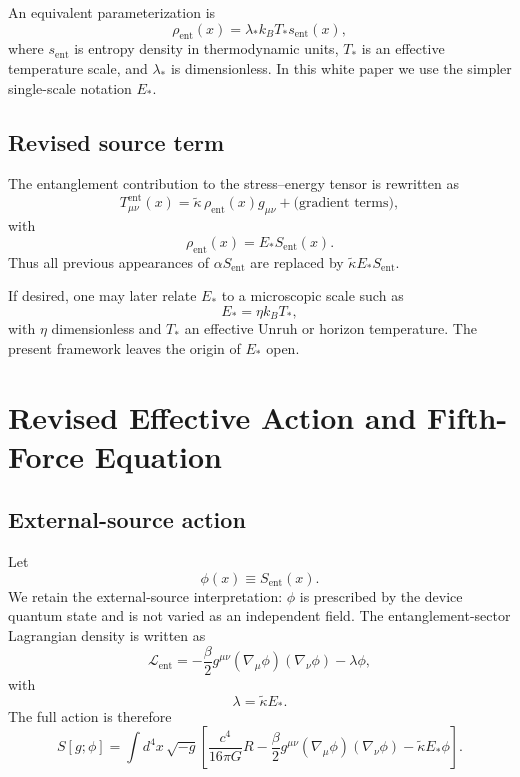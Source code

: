 \documentclass[11pt]{article}
\begin{document}
An equivalent parameterization is
\begin{equation}
\rho_{\mathrm{ent}}(x) = \lambda_* k_B T_* s_{\mathrm{ent}}(x),
\end{equation}
where $s_{\mathrm{ent}}$ is entropy density in thermodynamic units, $T_*$ is an effective temperature scale, and $\lambda_*$ is dimensionless. In this white paper we use the simpler single-scale notation $E_*$.

\subsection{Revised source term}

The entanglement contribution to the stress--energy tensor is rewritten as
\begin{equation}
T^{\mathrm{ent}}_{\mu\nu}(x) = \tilde{\kappa}\,\rho_{\mathrm{ent}}(x) g_{\mu\nu} + \text{(gradient terms)},
\end{equation}
with
\begin{equation}
\rho_{\mathrm{ent}}(x) = E_* S_{\mathrm{ent}}(x).
\end{equation}
Thus all previous appearances of $\alpha S_{\mathrm{ent}}$ are replaced by $\tilde{\kappa} E_* S_{\mathrm{ent}}$.

If desired, one may later relate $E_*$ to a microscopic scale such as
\begin{equation}
E_* = \eta k_B T_*,
\end{equation}
with $\eta$ dimensionless and $T_*$ an effective Unruh or horizon temperature. The present framework leaves the origin of $E_*$ open.

\section{Revised Effective Action and Fifth-Force Equation}

\subsection{External-source action}

Let
\begin{equation}
\phi(x) \equiv S_{\mathrm{ent}}(x).
\end{equation}
We retain the external-source interpretation: $\phi$ is prescribed by the device quantum state and is not varied as an independent field. The entanglement-sector Lagrangian density is written as
\begin{equation}
\mathcal{L}_{\mathrm{ent}} = -\frac{\beta}{2} g^{\mu\nu}(\nabla_\mu\phi)(\nabla_\nu\phi) - \lambda\phi,
\end{equation}
with
\begin{equation}
\lambda = \tilde{\kappa} E_*.
\end{equation}
The full action is therefore
\begin{equation}
S[g;\phi] = \int d^4x\,\sqrt{-g}\left[\frac{c^4}{16\pi G}R - \frac{\beta}{2} g^{\mu\nu}(\nabla_\mu\phi)(\nabla_\nu\phi) - \tilde{\kappa} E_*\phi\right].
\end{equation}
\end{document}

